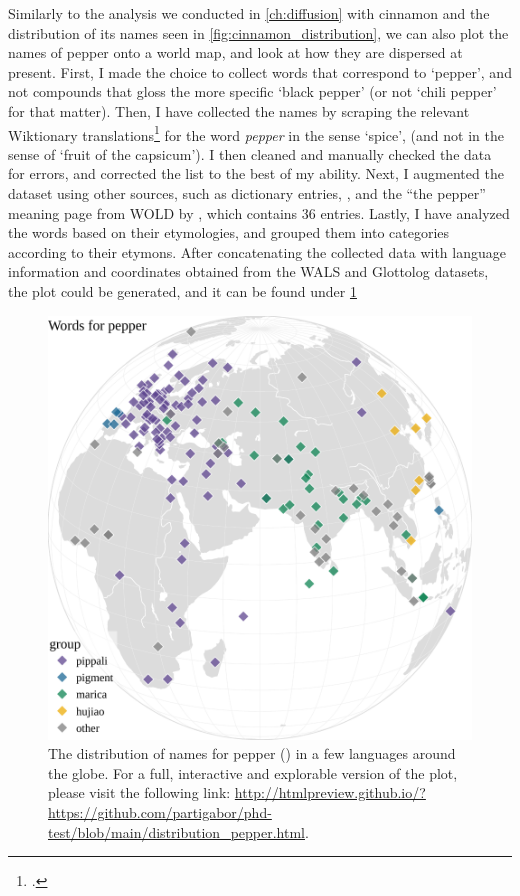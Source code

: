 Similarly to the analysis we conducted in \cref{ch:diffusion} with cinnamon and the distribution of its names seen in \cref{fig:cinnamon_distribution}, we can also plot the names of pepper onto a world map, and look at how they are dispersed at present. First, I made the choice to collect words that correspond to `pepper', and not compounds that gloss the more specific `black pepper' (or not `chili pepper' for that matter). Then, I have collected the names by scraping the relevant Wiktionary translations\footcite{noauthor_pepper_2022} for the word \textit{pepper} in the sense `spice', (and not in the sense of `fruit of the capsicum'). I then cleaned and manually checked the data for errors, and corrected the list to the best of my ability. Next, I augmented the dataset using other sources, such as dictionary entries, \textcite{katzer_spice_2012}, and the ``the pepper'' meaning page from \gls{WOLD} by \textcite{wold}, which contains 36 entries. Lastly, I have analyzed the words based on their etymologies, and grouped them into categories according to their etymons. After concatenating the collected data with language information and coordinates obtained from the \gls{WALS} and Glottolog datasets, the plot could be generated, and it can be found under \cref{fig:distribution_pepper}

\begin{figure}[!ht]
    \centering
    \includegraphics[width=\linewidth]{imgs/plots/distribution_pepper.pdf}
    \caption[The distribution of names for pepper ().]{The distribution of names for pepper () in a few languages around the globe. For a full, interactive and explorable version of the plot, please visit the following link: \url{http://htmlpreview.github.io/?https://github.com/partigabor/phd-test/blob/main/distribution_pepper.html}.}
    \label{fig:distribution_pepper}
\end{figure}

